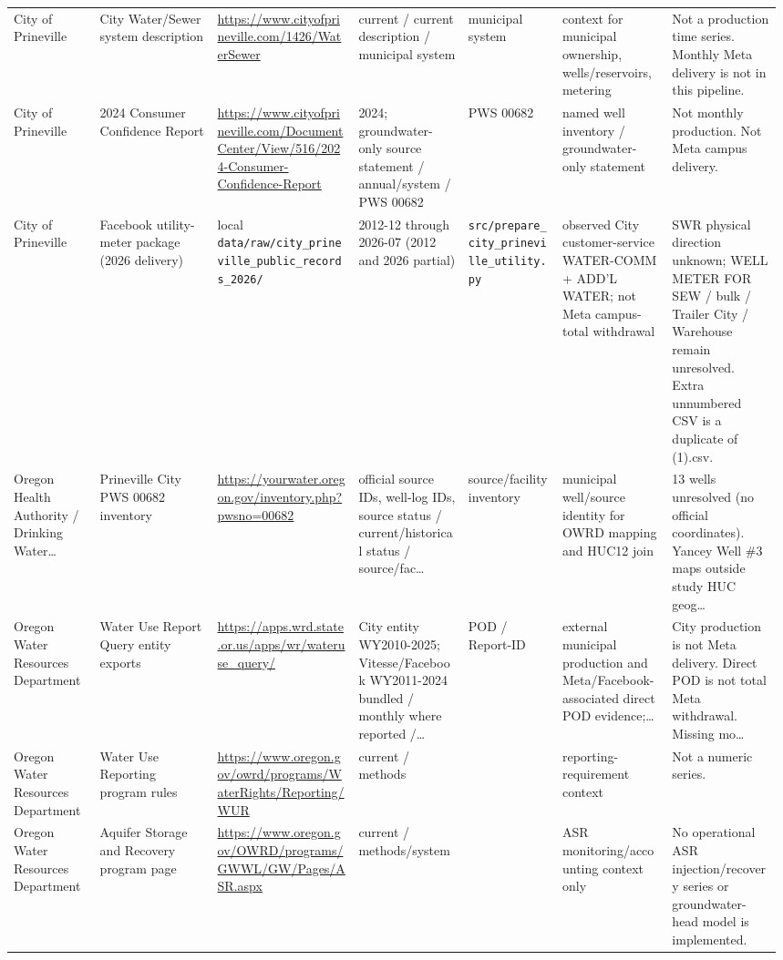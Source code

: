 \documentclass[11pt]{article}
\begin{document}
\begin{longtable}{@{}p{0.11\linewidth}p{0.15\linewidth}p{0.18\linewidth}p{0.14\linewidth}p{0.12\linewidth}p{0.14\linewidth}p{0.14\linewidth}@{}}
City of Prineville & City Water/Sewer system description & \url{https://www.cityofprineville.com/1426/WaterSewer} & current / current description / municipal system & municipal system & context for municipal ownership, wells/reservoirs, metering & Not a production time series. Monthly Meta delivery is not in this pipeline.\\
City of Prineville & 2024 Consumer Confidence Report & \url{https://www.cityofprineville.com/DocumentCenter/View/516/2024-Consumer-Confidence-Report} & 2024; groundwater-only source statement / annual/system / PWS 00682 & PWS 00682 & named well inventory / groundwater-only statement & Not monthly production. Not Meta campus delivery.\\
City of Prineville & Facebook utility-meter package (2026 delivery) & local \texttt{data/raw/city\_prineville\_public\_records\_2026/} & 2012-12 through 2026-07 (2012 and 2026 partial) & \texttt{src/prepare\_city\_prineville\_utility.py} & observed City customer-service WATER-COMM + ADD'L WATER; not Meta campus-total withdrawal & SWR physical direction unknown; WELL METER FOR SEW / bulk / Trailer City / Warehouse remain unresolved. Extra unnumbered CSV is a duplicate of (1).csv.\\
Oregon Health Authority / Drinking Water\ldots & Prineville City PWS 00682 inventory & \url{https://yourwater.oregon.gov/inventory.php?pwsno=00682} & official source IDs, well-log IDs, source status / current/historical status / source/fac\ldots & source/facility inventory & municipal well/source identity for OWRD mapping and HUC12 join & 13 wells unresolved (no official coordinates). Yancey Well \#3 maps outside study HUC geog\ldots\\
Oregon Water Resources Department & Water Use Report Query entity exports & \url{https://apps.wrd.state.or.us/apps/wr/wateruse_query/} & City entity WY2010-2025; Vitesse/Facebook WY2011-2024 bundled / monthly where reported /\ldots & POD / Report-ID & external municipal production and Meta/Facebook-associated direct POD evidence;\ldots & City production is not Meta delivery. Direct POD is not total Meta withdrawal. Missing mo\ldots\\
Oregon Water Resources Department & Water Use Reporting program rules & \url{https://www.oregon.gov/owrd/programs/WaterRights/Reporting/WUR} & current / methods &  & reporting-requirement context & Not a numeric series.\\
Oregon Water Resources Department & Aquifer Storage and Recovery program page & \url{https://www.oregon.gov/OWRD/programs/GWWL/GW/Pages/ASR.aspx} & current / methods/system &  & ASR monitoring/accounting context only & No operational ASR injection/recovery series or groundwater-head model is implemented.\\

\end{longtable}
\end{document}
